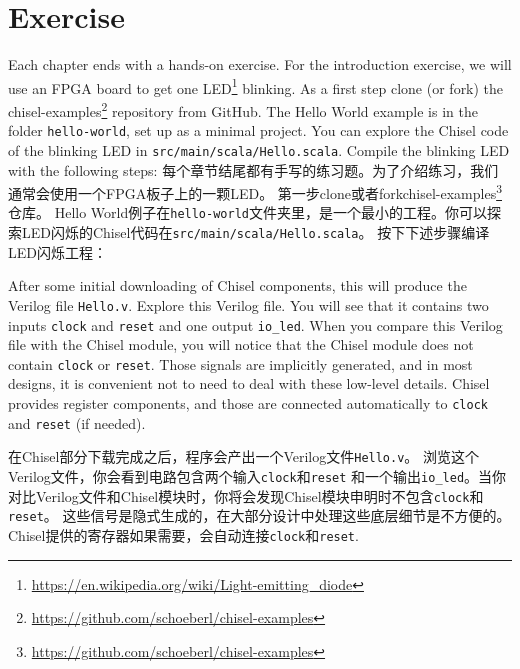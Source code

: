\documentclass[%
    10pt,
    headinclude, footexclude,
    openright, %
    notitlepage,
    cleardoubleempty,
    headsepline,
    pointlessnumbers,
    bibtotoc, idxtotoc,
    ]{scrbook}
\newcommand{\code}[1]{{\small{\texttt{#1}}}}
\newcommand{\myref}[2]{\href{#1}{#2}}
\renewcommand{\myref}[2]{{#2}{\footnote{\url{#1}}}}
\begin{document}
\section{Exercise}

Each chapter ends with a hands-on exercise. For the introduction exercise, we will use an
FPGA board to get one \myref{https://en.wikipedia.org/wiki/Light-emitting_diode}{LED} blinking.
As a first step clone (or fork) the \myref{https://github.com/schoeberl/chisel-examples}{chisel-examples}
repository from GitHub.
The Hello World example is in the folder \code{hello-world}, set up as
a minimal project. You can explore the Chisel code of the blinking LED
in \code{src/main/scala/Hello.scala}.
Compile the blinking LED with the following steps:
每个章节结尾都有手写的练习题。为了介绍练习，我们通常会使用一个FPGA板子上的一颗LED。
第一步clone或者fork\myref{https://github.com/schoeberl/chisel-examples}{chisel-examples}仓库。 
Hello World例子在\code{hello-world}文件夹里，是一个最小的工程。你可以探索LED闪烁的Chisel代码在\code{src/main/scala/Hello.scala}。
按下下述步骤编译LED闪烁工程：


After some initial downloading of Chisel components, this will produce the Verilog file \code{Hello.v}.
Explore this Verilog file. You will see that it contains two inputs \code{clock} and \code{reset}
and one output \code{io\_led}. When you compare this Verilog file with the Chisel module,
you will notice that the Chisel module does not contain \code{clock} or \code{reset}.
Those signals are implicitly generated, and in most designs, it is convenient not to need to
deal with these low-level details. Chisel provides register components, and those
are connected automatically to \code{clock} and \code{reset} (if needed).

在Chisel部分下载完成之后，程序会产出一个Verilog文件\code{Hello.v}。
浏览这个Verilog文件，你会看到电路包含两个输入\code{clock}和\code{reset}
和一个输出\code{io\_led}。当你对比Verilog文件和Chisel模块时，你将会发现Chisel模块申明时不包含\code{clock}和\code{reset}。
这些信号是隐式生成的，在大部分设计中处理这些底层细节是不方便的。Chisel提供的寄存器如果需要，会自动连接\code{clock}和\code{reset}.
\end{document}
